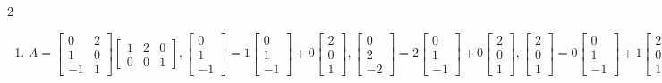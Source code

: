 \documentclass[10pt]{amsart}
\begin{document}
\begin{multicols}{2}
\begin{enumerate}
\item 
$A=\begin{bmatrix} 0&2\\1&0\\-1&1 \end{bmatrix}\begin{bmatrix} 1&2&0\\0&0&1 \end{bmatrix},
\begin{bmatrix} 0\\1\\-1 \end{bmatrix} = 1\begin{bmatrix} 0\\1\\-1 \end{bmatrix}+0\begin{bmatrix} 2\\0\\1 \end{bmatrix},
\begin{bmatrix} 0\\2\\-2 \end{bmatrix} = 2\begin{bmatrix} 0\\1\\-1 \end{bmatrix}+0\begin{bmatrix} 2\\0\\1 \end{bmatrix},
\begin{bmatrix} 2\\0\\1 \end{bmatrix} = 0\begin{bmatrix} 0\\1\\-1 \end{bmatrix}+1\begin{bmatrix} 2\\0\\1 \end{bmatrix},
\begin{bmatrix} 0&0&2 \end{bmatrix}=0\begin{bmatrix} 1&2&0 \end{bmatrix}+2\begin{bmatrix} 0&0&1 \end{bmatrix},
\begin{bmatrix} 1&2&0 \end{bmatrix}=1\begin{bmatrix} 1&2&0 \end{bmatrix}+0\begin{bmatrix} 0&0&1 \end{bmatrix},
\begin{bmatrix} -1&-2&1 \end{bmatrix}=-1\begin{bmatrix} 1&2&0 \end{bmatrix}+1\begin{bmatrix} 0&0&1 \end{bmatrix},
$


\end{enumerate}
\end{multicols}
\end{document}
